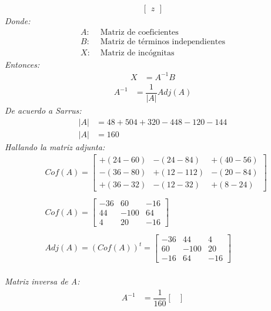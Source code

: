 \documentclass[11pt, a4paper]{article}
\begin{document}
\begin{multicols}{2}
\begin{align*}
\begin{bmatrix}
      z
    \end{bmatrix}
  \end{align*}
  \textit{Donde:}
  \begin{align*}
    A: &\text{ Matriz de coeficientes}\\
    B: &\text{ Matriz de términos independientes}\\
    X: &\text{ Matriz de incógnitas}
  \end{align*}
  \textit{Entonces:}
  \begin{align*}
    X &= A^{-1}B
  \end{align*}
  \begin{align*}
    A^{-1} &= \dfrac{1}{|A|}Adj\left(A\right)
  \end{align*}
  \textit{De acuerdo a Sarrus:}
  \begin{align*}
    |A| &= 48+504+320-448-120-144\\
    |A| &= 160
  \end{align*}
  \textit{Hallando la matriz adjunta:}
  \begin{align*}
    &Cof\left(A\right) = \begin{bmatrix}
      +\left(24-60\right) & -\left(24-84\right) & +\left(40-56\right)\\
      -\left(36-80\right) & +\left(12-112\right) & -\left(20-84\right)\\
      +\left(36-32\right) & -\left(12-32\right) & +\left(8-24\right)
    \end{bmatrix}\\\\
    &Cof\left(A\right) = \begin{bmatrix}
      -36 & 60 & -16\\
      44 & -100 & 64\\
      4 & 20 & -16
    \end{bmatrix}\\\\
    &Adj\left(A\right) = \left(Cof\left(A\right)\right)^t = \begin{bmatrix}
      -36 & 44 & 4\\
      60 & -100 & 20\\
      -16 & 64 & -16
    \end{bmatrix}
  \end{align*}
  \columnbreak\\
  \columnseprule=1pt 
  \textit{Matriz inversa de A:}
  \begin{align*}
    A^{-1} &= \dfrac{1}{160}\begin{bmatrix}

\end{bmatrix}
\end{align*}
\end{multicols}
\end{document}
